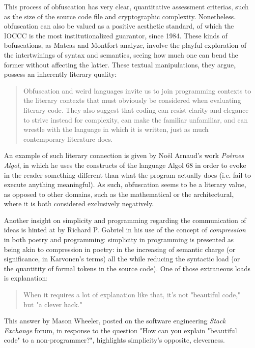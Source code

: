 This process of obfuscation has very clear, quantitative assessment criterias, such as the size of the source code file and cryptographic complexity\cite{pellet-mary_co6gc_2020}. Nonetheless. obfuscation can also be valued as a positive aesthetic standard, of which the IOCCC is the most institutionalized guarantor, since 1984. These kinds of bofuscations, as Mateas and Montfort analyze, involve the playful exploration of the intertwinings of syntax and semantics, seeing how much one can bend the former without affecting the latter. These textual manipulations, they argue, possess an inherently literary quality:

\begin{quote}
  Obfuscation and weird languages invite us to join programming contexts to the literary contexts that must obviously be considered when evaluating literary code. They also suggest that coding can resist clarity and elegance to strive instead for complexity, can make the familiar unfamiliar, and can wrestle with the language in which it is written, just as much contemporary literature does.\cite{mateas_box_2005}
\end{quote}

An example of such literary connection is given by Noël Arnaud's work \emph{Poèmes Algol}\cite{arnaud_poemes_1968}, in which he uses the constructs of the language Algol 68 in order to evoke in the reader something different than what the program actually does (i.e. fail to execute anything meaningful). As such, obfuscation seems to be a literary value, as opposed to other domains, such as the mathematical or the architectural, where it is both considered exclusively negatively.

Another insight on simplicity and programming regarding the communication of ideas is hinted at by Richard P. Gabriel in his use of the concept of \emph{compression} in both poetry and programming: simplicity in programming is presented as being akin to compression in poetry: in the increasing of semantic charge (or significance, in Karvonen's terms) all the while reducing the syntactic load (or the quantitity of formal tokens in the source code). One of those extraneous loads is explanation:

\begin{quote}
  When it requires a lot of explanation like that, it's not "beautiful code," but "a clever hack."\cite{how_2013a}
\end{quote}

This answer by Mason Wheeler, posted on the software engineering \emph{Stack Exchange} forum, in response to the question "How can you explain "beautiful code" to a non-programmer?"\cite{how_2013a}, highlights simplicity's opposite, cleverness.

